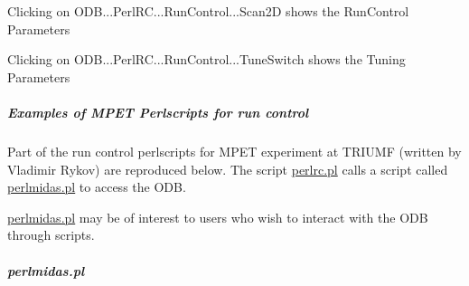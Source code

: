 \begin{DoxyItemize}
\item Clicking on ODB...PerlRC...RunControl...Scan2D shows the RunControl Parameters 
\item Clicking on ODB...PerlRC...RunControl...TuneSwitch shows the Tuning Parameters 
\end{DoxyItemize}

\par
 

 \par
\subparagraph{Examples of MPET Perlscripts for run control}\label{RC_mhttpd_perlrc}
\par


 \label{RC_mhttpd_perlrc_idx_script_perlmidas}
\hypertarget{RC_mhttpd_perlrc_idx_script_perlmidas}{}


Part of the run control perlscripts for MPET experiment at TRIUMF (written by Vladimir Rykov) are reproduced below. The script \hyperlink{RC_mhttpd_perlrc_RC_mhttpd_perlrc_script}{perlrc.pl} calls a script called \hyperlink{RC_mhttpd_perlrc_RC_mhttpd_perlmidas_script}{perlmidas.pl} to access the ODB.

\hyperlink{RC_mhttpd_perlrc_RC_mhttpd_perlmidas_script}{perlmidas.pl} may be of interest to users who wish to interact with the ODB through scripts.\hypertarget{RC_mhttpd_perlrc_RC_mhttpd_perlmidas_script}{}\subparagraph{perlmidas.pl}\label{RC_mhttpd_perlrc_RC_mhttpd_perlmidas_script}

